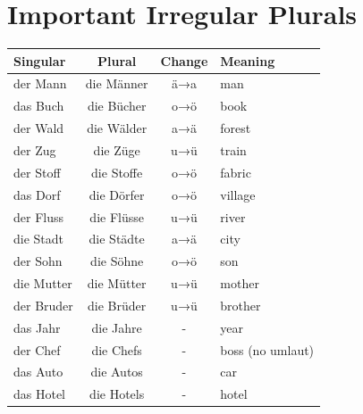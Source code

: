 \section{Important Irregular Plurals}
\label{sec:IrregularPlurals}

\begin{center}
\begin{tabular}{|l|c|c|l|}
\hline
Singular & Plural & Change & Meaning \\ \hline
der Mann & die Männer & ä→a & man \\ \hline
das Buch & die Bücher & o→ö & book \\ \hline
der Wald & die Wälder & a→ä & forest \\ \hline
der Zug & die Züge & u→ü & train \\ \hline
der Stoff & die Stoffe & o→ö & fabric \\ \hline
das Dorf & die Dörfer & o→ö & village \\ \hline
der Fluss & die Flüsse & u→ü & river \\ \hline
die Stadt & die Städte & a→ä & city \\ \hline
der Sohn & die Söhne & o→ö & son \\ \hline
die Mutter & die Mütter & u→ü & mother \\ \hline
der Bruder & die Brüder & u→ü & brother \\ \hline
das Jahr & die Jahre & - & year \\ \hline
der Chef & die Chefs & - & boss (no umlaut) \\ \hline
das Auto & die Autos & - & car \\ \hline
das Hotel & die Hotels & - & hotel \\ \hline
\end{tabular}
\end{center}

\chapterend